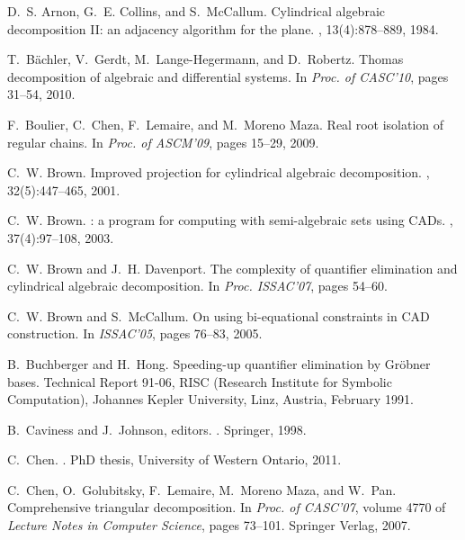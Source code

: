 \documentclass[10pt]{article}
\begin{document}
\begin{center}
\begin{thebibliography}{10}
D.~S. Arnon, G.~E. Collins, and S.~McCallum.
\newblock Cylindrical algebraic decomposition {II}: an adjacency algorithm for
  the plane.
, 13(4):878--889, 1984.

T.~B\"{a}chler, V.~Gerdt, M.~Lange-Hegermann, and D.~Robertz.
\newblock Thomas decomposition of algebraic and differential systems.
\newblock In {\em Proc. of CASC'10}, pages 31--54, 2010.

F.~Boulier, C.~Chen, F.~Lemaire, and M.~{Moreno Maza}.
\newblock Real root isolation of regular chains.
\newblock In {\em Proc. of {ASCM'09}}, pages 15--29, 2009.

C.~W. Brown.
\newblock Improved projection for cylindrical algebraic decomposition.
, 32(5):447--465, 2001.

C.~W. Brown.
: a program for computing with semi-algebraic sets
  using {CAD}s.
, 37(4):97--108, 2003.

C.~W. Brown and J.~H. Davenport.
\newblock The complexity of quantifier elimination and cylindrical algebraic
  decomposition.
\newblock In {\em Proc. ISSAC'07}, pages 54--60.

C.~W. Brown and S.~McCallum.
\newblock On using bi-equational constraints in {CAD} construction.
\newblock In {\em ISSAC'05}, pages 76--83, 2005.

B.~Buchberger and H.~Hong.
\newblock Speeding-up quantifier elimination by {Gr\"{o}bner} bases.
\newblock Technical Report 91-06, {RISC} (Research Institute for Symbolic
  Computation), Johannes Kepler University, Linz, Austria, February 1991.

B.~Caviness and J.~Johnson, editors.
.
\newblock Springer, 1998.

C.~Chen.
.
\newblock PhD thesis, University of Western Ontario, 2011.

C.~Chen, O.~Golubitsky, F.~Lemaire, M.~{{Moreno Maza}}, and W.~Pan.
\newblock Comprehensive triangular decomposition.
\newblock In {\em {Proc. of CASC'07}}, volume 4770 of {\em Lecture Notes in
  Computer Science}, pages 73--101. Springer Verlag, 2007.


\end{thebibliography}
\end{center}
\end{document}
